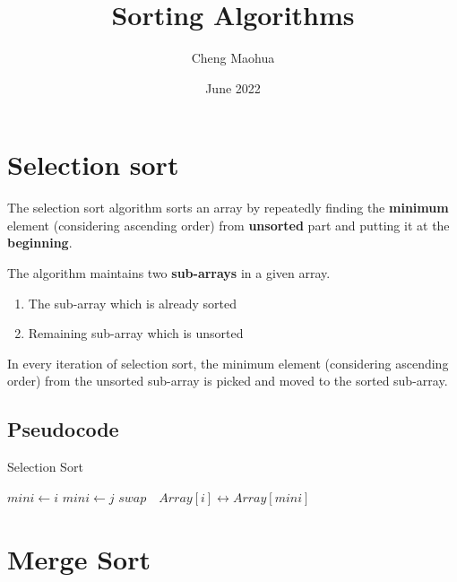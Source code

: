 \documentclass{article}
\title{Sorting Algorithms}
\author{Cheng Maohua}
\date{June 2022}
\begin{document}
\maketitle

\section{Selection sort}

The selection sort algorithm sorts an array by repeatedly finding the \textbf{minimum} element (considering ascending order) from \textbf{unsorted} part and putting it at the \textbf{beginning}. 

The algorithm maintains two \textbf{sub-arrays} in a given array.
\begin{enumerate}
\item The sub-array which is already sorted
\item Remaining sub-array which is unsorted
\end{enumerate}

In every iteration of selection sort, the minimum element (considering ascending order) from the unsorted sub-array is picked and moved to the sorted sub-array.

\subsection{Pseudocode} 

\begin{algorithm}
    \caption{Selection Sort}
    \begin{algorithmic}[1]
            \State $mini\gets i$   
              
                    \State $mini \gets j$
                \EndIf
            \EndFor
                \State $swap \quad Array[i]\leftrightarrow Array[mini]$ 
            \EndIf        
        \EndFor
        \EndFunction
    \end{algorithmic}
\end{algorithm}

\section{Merge Sort}
\end{document}
